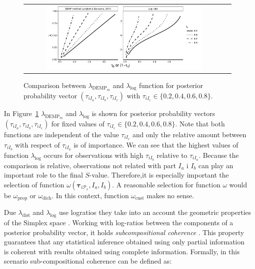 \documentclass[submit]{smj}
\theoremstyle{definition}
\newcommand{\m}[1]{\boldsymbol{#1}}
\begin{document}
\begin{figure}[t]
\begin{center}
\begin{tabular}{cc}
  \includegraphics[width=0.8\textwidth]{figures/demp2_log.pdf} \\
 \end{tabular}
 \caption{Comparison between $\lambda_{\text{DEMP}_m}$ and $\lambda_{\log}$ function for posterior probability 
vector $\left(\tau_{iI_a}, \tau_{iI_b}, \tau_{iI_c} \right)$ with $\tau_{iI_c} \in \{0.2, 0.4, 0.6, 0.8\}$.} 
\label{nonsymetric}
\end{center}
\end{figure}

In Figure~\ref{nonsymetric} $\lambda_{\text{DEMP}_m}$ and $\lambda_{\log}$ is shown for posterior probability vectors $\left(\tau_{iI_a}, \tau_{iI_b}, \tau_{iI_c}\right)$ for fixed values of $\tau_{iI_c} \in \{0.2, 0.4, 0.6, 0.8\}$. Note that both functions are independent of the value $\tau_{iI_c}$ and only the relative amount between $\tau_{iI_b}$ with respect of $\tau_{iI_a}$ is of importance. We can see that the highest values of function $\lambda_{\log}$ occurs for observations with high $\tau_{iI_b}$ relative to $\tau_{iI_a}$. Because the comparison is relative, observations not related with part $I_a$ i $I_b$ can play an important role to the final $S$-value. Therefore,it is especially important the selection of function $\omega(\m\tau_{i \mathcal{P}_s},  I_a,  I_b)$. A reasonable selection for function $\omega$ would be $\omega_{\text{prop}}$ or $\omega_{\text{dich}}$. In this context, function $\omega_{\text{cnst}}$ makes no sense.

Due $\lambda_{\text{dist}}$ and $\lambda_{\log}$ use logratios they take into an account the geometric properties of the Simplex space \citep{aitchison2002simplicial}.  Working with log-ratios between the components of a posterior probability vector, it holds \emph{subcompositional coherence}  \citep{aitchison1986statistical}. This property guarantees that any statistical inference obtained using only partial information is coherent with results obtained using complete information. Formally, in this scenario sub-compositional coherence can be defined as:
\end{document}
